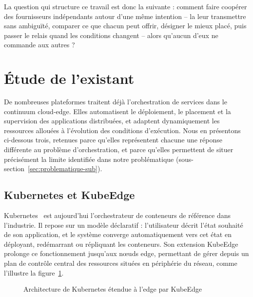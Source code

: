 La question qui structure ce travail est donc la suivante : comment faire coopérer des fournisseurs indépendants autour d'une même intention -- la leur transmettre sans ambiguïté, comparer ce que chacun peut offrir, désigner le mieux placé, puis passer le relais quand les conditions changent -- alors qu'aucun d'eux ne commande aux autres ?

\section{Étude de l'existant}
\label{sec:etat-art}

De nombreuses plateformes traitent déjà l'orchestration de services dans le continuum cloud-edge. Elles automatisent le déploiement, le placement et la supervision des applications distribuées, et adaptent dynamiquement les ressources allouées à l'évolution des conditions d'exécution. Nous en présentons ci-dessous trois, retenues parce qu'elles représentent chacune une réponse différente au problème d'orchestration, et parce qu'elles permettent de situer précisément la limite identifiée dans notre problématique (sous-section~\ref{sec:problematique-sub}).

\subsection{Kubernetes et KubeEdge}
\label{sec:etat-art-k8s}

Kubernetes~\cite{website:kubernetes} est aujourd'hui l'orchestrateur de conteneurs de référence dans l'industrie. Il repose sur un modèle déclaratif : l'utilisateur décrit l'état souhaité de son application, et le système converge automatiquement vers cet état en déployant, redémarrant ou répliquant les conteneurs. Son extension KubeEdge~\cite{website:kubeedge} prolonge ce fonctionnement jusqu'aux nœuds edge, permettant de gérer depuis un plan de contrôle central des ressources situées en périphérie du réseau, comme l'illustre la figure~\ref{fig:kubernetes}.

\begin{figure}[H]
    \centering
    \caption{Architecture de Kubernetes étendue à l'edge par KubeEdge}
    \label{fig:kubernetes}
\end{figure}

